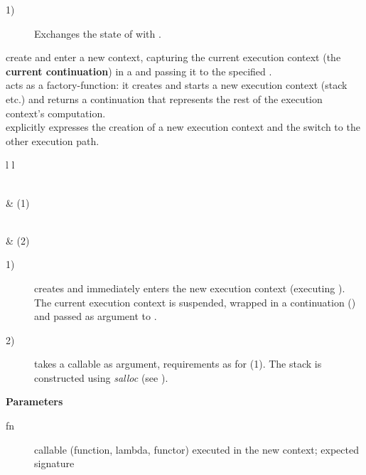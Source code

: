 \begin{description}
    \item[1)] Exchanges the state of  with .\\
\end{description}



create and enter a new context, capturing the current execution context (the
{\bfseries current continuation}) in a \cont and passing it to the specified
\entryfn.\\
\callcc acts as a factory-function: it creates and starts a new execution
context (stack etc.) and returns a continuation that represents the rest of the
execution context's computation.\\
\callcc explicitly expresses the creation of a new execution context and the
switch to the other execution path.\\

\begin{tabular}{ l l }
    \midrule

    \\
     & (1)\\

    \midrule

    \\
     & (2)\\

    \midrule
\end{tabular}

\begin{description}
    \item[1)] creates and immediately enters the new execution context
              (executing ). The current execution context is suspended,
              wrapped in a continuation (\cont) and passed as argument to
              .
    \item[2)] takes a callable as argument, requirements as for (1). The stack
              is constructed using \emph{salloc}
              (see ).
\end{description}

{\bfseries Parameters}
\begin{description}
    \item[fn]      callable (function, lambda, functor) executed in the new
                   context; expected signature  
\end{description}

